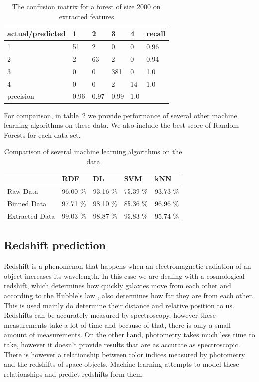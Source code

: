 \documentclass[thesis=B,english]{FITthesis}[2012/10/20]
\begin{document}
\begin{table}[h]
\begin{tabular}{|l|l|l|l|l|l|}
\hline
actual/predicted & 1 & 2 & 3 & 4 & recall \\ \hline
1 & 51 & 2 & 0 & 0 & 0.96 \\ \hline
2 & 2 & 63 & 2 & 0 & 0.94 \\ \hline
3 & 0 & 0 & 381 & 0 & 1.0 \\ \hline
4 & 0 & 0 & 2 & 14 & 1.0 \\ \hline
precision & 0.96 & 0.97 & 0.99 & 1.0 &  \\ \hline
\end{tabular}
\caption{The confusion matrix for a forest of size 2000 on extracted features}
\label{tab:confextra}
\end{table}
For comparison, in table~\ref{tab:spectra_allml} we provide performance of several other machine learning algorithms on these data. We also include the best score of Random Forests for each data set.
\begin{table}
    \begin{tabular}{|l|l|l|l|l|}
    \hline
    ~              & RDF       & DL       & SVM      & kNN      \\ \hline
    Raw Data       & 96.00 \%  & 93.16 \%   & 75.39 \% & 93.73 \% \\ \hline
    Binned Data    & 97.71 \%  & 98.10 \%   & 85.36 \% & 96.96 \% \\ \hline
    Extracted Data & 99.03 \%  & 98,87 \% & 95.83 \% & 95.74 \% \\ \hline
    \end{tabular}
    \caption{Comparison of several machine learning algorithms on the data}
    \label{tab:spectra_allml}
\end{table}

\subsection{Redshift prediction}
Redshift is a phenomenon that happens when an electromagnetic radiation of an object increases its wavelength. In this case we are dealing with a cosmological redshift, which determines how quickly galaxies move from each other and according to the Hubble's law \cite{hubble1937observational}, also determines how far they are from each other. This is used mainly do determine their distance and relative position to us. Redshifts can be accurately measured by spectroscopy, however these measurements take a lot of time and because of that, there is only a small amount of measurements. On the other hand, photometry takes much less time to take, however it doesn't provide results that are as accurate as spectroscopic. There is however a relationship between color indices measured by photometry and the redshifts of space objects. Machine learning attempts to model these relationships and predict redshifts form them. 
\end{document}
